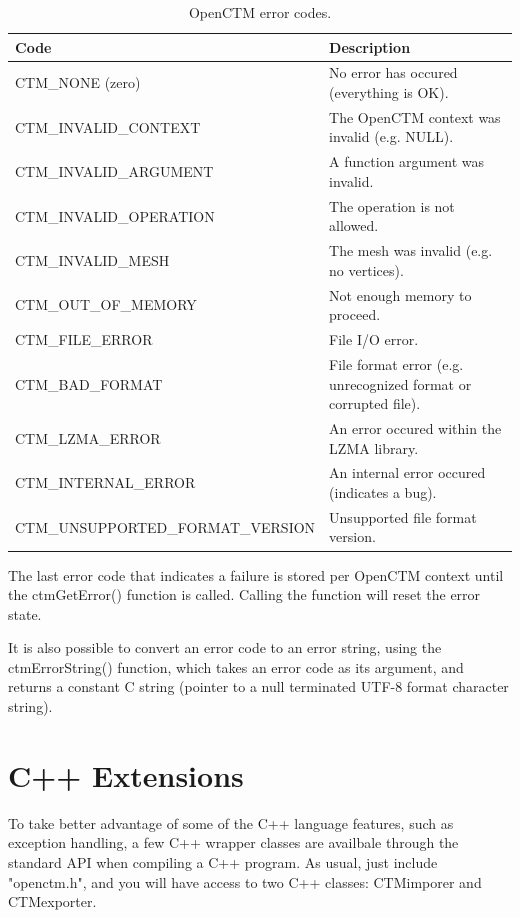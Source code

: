 \begin{table}[p]
\centering
\begin{tabular}{|l|p{7cm}|}\hline
\textbf{Code} & \textbf{Description}\\ \hline
CTM\_NONE (zero) & No error has occured (everything is OK).\\ \hline
CTM\_INVALID\_CONTEXT & The OpenCTM context was invalid (e.g. NULL).\\ \hline
CTM\_INVALID\_ARGUMENT & A function argument was invalid.\\ \hline
CTM\_INVALID\_OPERATION & The operation is not allowed.\\ \hline
CTM\_INVALID\_MESH & The mesh was invalid (e.g. no vertices).\\ \hline
CTM\_OUT\_OF\_MEMORY & Not enough memory to proceed.\\ \hline
CTM\_FILE\_ERROR & File I/O error.\\ \hline
CTM\_BAD\_FORMAT & File format error (e.g. unrecognized format or corrupted file).\\ \hline
CTM\_LZMA\_ERROR & An error occured within the LZMA library.\\ \hline
CTM\_INTERNAL\_ERROR & An internal error occured (indicates a bug).\\ \hline
CTM\_UNSUPPORTED\_FORMAT\_VERSION & Unsupported file format version.\\ \hline
\end{tabular}
\caption{OpenCTM error codes.}
\label{tab:ErrorCodes}
\end{table}

The last error code that indicates a failure is stored per OpenCTM context
until the ctmGetError() function is called. Calling the function will reset
the error state.

It is also possible to convert an error code to an error string, using the
ctmErrorString() function, which takes an error code as its argument, and
returns a constant C string (pointer to a null terminated UTF-8 format
character string).




\chapter{C++ Extensions}
To take better advantage of some of the C++ language features, such as
exception handling, a few C++ wrapper classes are availbale through the standard
API when compiling a C++ program. As usual, just include "openctm.h", and you
will have access to two C++ classes: CTMimporer and CTMexporter.


